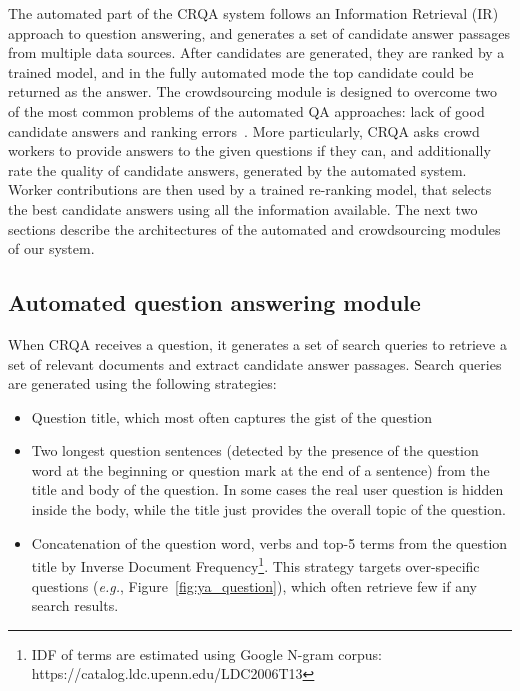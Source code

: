 The automated part of the CRQA system follows an Information Retrieval (IR) approach to question answering, and generates a set of candidate answer passages from multiple data sources.
After candidates are generated, they are ranked by a trained model, and in the fully automated mode the top candidate could be returned as the answer.
The crowdsourcing module is designed to overcome two of the most common problems of the automated QA approaches: lack of good candidate answers and ranking errors~\cite{moldovan2003performance,savenkov_trecliveqa15}.
More particularly, CRQA asks crowd workers to provide answers to the given questions if they can, and additionally rate the quality of candidate answers, generated by the automated system.
Worker contributions are then used by a trained re-ranking model, that selects the best candidate answers using all the information available.
The next two sections describe the architectures of the automated and crowdsourcing modules of our system.

\subsection{Automated question answering module}
\label{sec:system:auto}

When CRQA receives a question, it generates a set of search queries to retrieve a set of relevant documents and extract candidate answer passages.
Search queries are generated using the following strategies:
\begin{itemize}
\item Question title, which most often captures the gist of the question
\item Two longest question sentences (detected by the presence of the question word at the beginning or question mark at the end of a sentence) from the title and body of the question. In some cases the real user question is hidden inside the body, while the title just provides the overall topic of the question.
\item Concatenation of the question word, verbs and top-5 terms from the question title by Inverse Document Frequency\footnote{IDF of terms are estimated using Google N-gram corpus: https://catalog.ldc.upenn.edu/LDC2006T13}. This strategy targets over-specific questions (\textit{e.g.}, Figure~\ref{fig:ya_question}), which often retrieve few if any search results.
\end{itemize}


